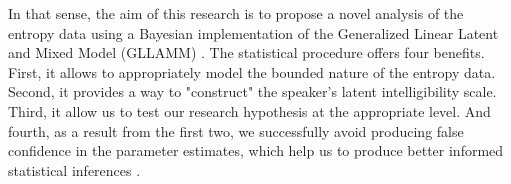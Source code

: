 \begin{comment}
	As it was suggested, several factors are proposed by the literature, but these can be largely grouped into three categories: audiology, child and environmental related factors. For the first, they are the chronological age, age at implantation, the duration of device use, `hearing' age, bilateral or contralateral cochlear implantation, and the children's preoperative and postoperative hearing levels. For the second, there is the etiology or the cause of the hearing impairment (e.g. genetic, infections), additional disabilities (e.g. mental retardation, speech motor problems), and gender. Finally for the last, there is the communication modality. 
	
	Therefore, considering the aforementioned variables, and the relation complexity with themselves and the outcome, we believe that a causal framework would allow us to integrate previous literature on the matter, and also provide a more transparent way of state and analyze our research hypothesis.
	
\end{comment}

In that sense, the aim of this research is to propose a novel analysis of the entropy data using a Bayesian implementation of the Generalized Linear Latent and Mixed Model (GLLAMM) \citep{Rabe_et_al_2004a, Rabe_et_al_2004b, Rabe_et_al_2004c, Rabe_et_al_2012, Skrondal_et_al_2004a}. The statistical procedure offers four benefits. First, it allows to appropriately model the bounded nature of the entropy data. Second, it provides a way to "construct" the speaker's latent intelligibility scale. Third, it allow us to test our research hypothesis at the appropriate level. And fourth, as a result from the first two, we successfully avoid producing false confidence in the parameter estimates, which help us to produce better informed statistical inferences \citep{McElreath_2020}.

